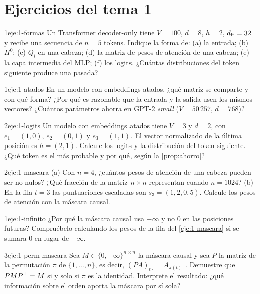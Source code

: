 \section*{Ejercicios del tema 1}

\begin{ejercicio}{1}{eje:1-formas}
Un Transformer decoder-only tiene $V=100$, $d=8$, $h=2$, $d_{\mathrm{ff}}=32$ y recibe una secuencia de $n=5$ tokens. Indique la forma de: (a) la entrada; (b) $H^{0}$; (c) $Q_i$ en una cabeza; (d) la matriz de pesos de atención de una cabeza; (e) la capa intermedia del MLP; (f) los logits. ¿Cuántas distribuciones del token siguiente produce una pasada?
\end{ejercicio}

\begin{ejercicio}{1}{eje:1-atados}
En un modelo con embeddings atados, ¿qué matriz se comparte y con qué forma? ¿Por qué es razonable que la entrada y la salida usen los mismos vectores? ¿Cuántos parámetros ahorra en GPT-2 \emph{small} ($V=50\,257$, $d=768$)?
\end{ejercicio}

\begin{ejercicio}{2}{eje:1-logits}
Un modelo con embeddings atados tiene $V=3$ y $d=2$, con $e_1=(1,0)$, $e_2=(0,1)$ y $e_3=(1,1)$. El vector normalizado de la última posición es $h=(2,1)$. Calcule los logits y la distribución del token siguiente. ¿Qué token es el más probable y por qué, según la \cref{prop:ahorro}?
\end{ejercicio}

\begin{ejercicio}{2}{eje:1-mascara}
(a) Con $n=4$, ¿cuántos pesos de atención de una cabeza pueden ser no nulos? ¿Qué fracción de la matriz $n\times n$ representan cuando $n=1024$? (b) En la fila $t=3$ las puntuaciones escaladas son $s_3=(1,2,0,5)$. Calcule los pesos de atención con la máscara causal.
\end{ejercicio}

\begin{ejercicio}{1}{eje:1-infinito}
¿Por qué la máscara causal usa $-\infty$ y no $0$ en las posiciones futuras? Compruébelo calculando los pesos de la fila del \cref{eje:1-mascara} si se sumara $0$ en lugar de $-\infty$.
\end{ejercicio}

\begin{ejercicio}{3}{eje:1-perm-mascara}
Sea $M\in\{0,-\infty\}^{n\times n}$ la máscara causal y sea $P$ la matriz de la permutación $\pi$ de $\{1,\dots,n\}$, es decir, $(PA)_{t\cdot}=A_{\pi(t)\cdot}$. Demuestre que $PMP^{\top}=M$ si y solo si $\pi$ es la identidad. Interprete el resultado: ¿qué información sobre el orden aporta la máscara por sí sola?
\end{ejercicio}
